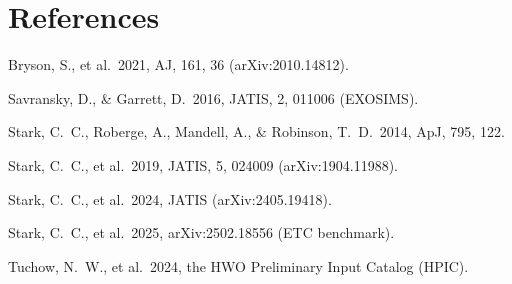 \documentclass[11pt,a4paper]{article}
\begin{document}
\section*{References}

\begin{description}\small
\item[{[bryson2021]}] Bryson, S., et al.\ 2021, AJ, 161, 36 (arXiv:2010.14812).
\item[{[savransky2016]}] Savransky, D., \& Garrett, D.\ 2016, JATIS, 2, 011006 (EXOSIMS).
\item[{[stark2014]}] Stark, C.~C., Roberge, A., Mandell, A., \& Robinson, T.~D.\ 2014, ApJ, 795, 122.
\item[{[stark2019]}] Stark, C.~C., et al.\ 2019, JATIS, 5, 024009 (arXiv:1904.11988).
\item[{[stark2024]}] Stark, C.~C., et al.\ 2024, JATIS (arXiv:2405.19418).
\item[{[stark2025]}] Stark, C.~C., et al.\ 2025, arXiv:2502.18556 (ETC benchmark).
\item[{[tuchow2024]}] Tuchow, N.~W., et al.\ 2024, the HWO Preliminary Input Catalog (HPIC).
\end{description}
\end{document}
